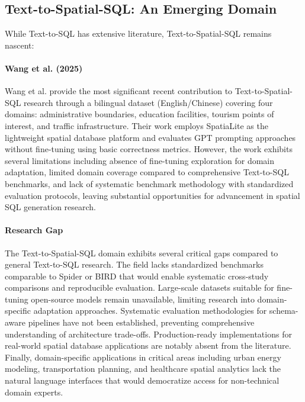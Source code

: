\subsection{Text-to-Spatial-SQL: An Emerging Domain}

While Text-to-SQL has extensive literature, Text-to-Spatial-SQL remains nascent:

\paragraph{Wang et al. (2025)~\cite{wang_spatial_ijgi}}

Wang et al. provide the most significant recent contribution to Text-to-Spatial-SQL research through a bilingual dataset (English/Chinese) covering four domains: administrative boundaries, education facilities, tourism points of interest, and traffic infrastructure. Their work employs SpatiaLite as the lightweight spatial database platform and evaluates GPT prompting approaches without fine-tuning using basic correctness metrics. However, the work exhibits several limitations including absence of fine-tuning exploration for domain adaptation, limited domain coverage compared to comprehensive Text-to-SQL benchmarks, and lack of systematic benchmark methodology with standardized evaluation protocols, leaving substantial opportunities for advancement in spatial SQL generation research.

\paragraph{Research Gap}

The Text-to-Spatial-SQL domain exhibits several critical gaps compared to general Text-to-SQL research. The field lacks standardized benchmarks comparable to Spider or BIRD that would enable systematic cross-study comparisons and reproducible evaluation. Large-scale datasets suitable for fine-tuning open-source models remain unavailable, limiting research into domain-specific adaptation approaches. Systematic evaluation methodologies for schema-aware pipelines have not been established, preventing comprehensive understanding of architecture trade-offs. Production-ready implementations for real-world spatial database applications are notably absent from the literature. Finally, domain-specific applications in critical areas including urban energy modeling, transportation planning, and healthcare spatial analytics lack the natural language interfaces that would democratize access for non-technical domain experts.

